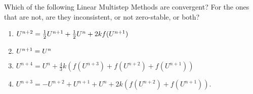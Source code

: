 

Which of the following Linear Multistep Methods are convergent?  For
the ones that are not, are they inconsistent, or not zero-stable, or both?
 \begin{enumerate} 
 \item $U^{n+2} = \frac{1}{2} U^{n+1} + \frac{1}{2} U^{n} + 2kf(U^{n+1})$
 \item $U^{n+1} = U^n$
 \item $U^{n+4} = U^{n} + \frac 4 3 k(f(U^{n+3})+f(U^{n+2})+f(U^{n+1}))$
 \item $U^{n+3} = -U^{n+2} + U^{n+1} +U^{n}+2k(f(U^{n+2})+f(U^{n+1}))$.
 \end{enumerate}

